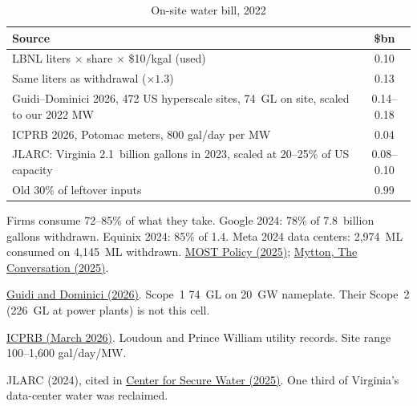 \documentclass[11pt]{article}
\newcommand{\bn}{\$bn}
\begin{document}
\begin{table}[ht]
\centering
\begin{threeparttable}
\caption{On-site water bill, 2022}
\label{tab:water}
\begin{tabular}{p{11.2cm}c}
\toprule
Source & \bn \\
\midrule
LBNL liters $\times$ share $\times$ \$10/kgal (used) & 0.10 \\
Same liters as withdrawal ($\times 1.3$)\tnote{a} & 0.13 \\
Guidi--Dominici 2026, 472 US hyperscale sites, 74~GL on site, scaled to our 2022 MW\tnote{b} & 0.14--0.18 \\
ICPRB 2026, Potomac meters, 800 gal/day per MW\tnote{c} & 0.04 \\
JLARC: Virginia 2.1~billion gallons in 2023, scaled at 20--25\% of US capacity\tnote{d} & 0.08--0.10 \\
Old 30\% of leftover inputs & 0.99 \\
\bottomrule
\end{tabular}
\begin{tablenotes}\footnotesize
\item[a] Firms consume 72--85\% of what they take. Google 2024: 78\% of 7.8~billion gallons withdrawn. Equinix 2024: 85\% of 1.4. Meta 2024 data centers: 2{,}974~ML consumed on 4{,}145~ML withdrawn. \href{https://mostpolicyinitiative.org/science-note/data-center-water-use/}{MOST Policy (2025)}; \href{https://theconversation.com/data-centers-consume-massive-amounts-of-water-companies-rarely-tell-the-public-exactly-how-much-262901}{Mytton, The Conversation (2025)}.
\item[b] \href{https://arxiv.org/abs/2607.02531}{Guidi and Dominici (2026)}. Scope~1 74~GL on 20~GW nameplate. Their Scope~2 (226~GL at power plants) is not this cell.
\item[c] \href{https://www.potomacriver.org/wp-content/uploads/2026/03/ICPRB.DataCentersandWaterUse.ICPRB_.March2026.pdf}{ICPRB (March 2026)}. Loudoun and Prince William utility records. Site range 100--1{,}600 gal/day/MW.
\item[d] JLARC (2024), cited in \href{https://securewater.illinois.edu/data-center-expansion-in-virginia-closing-critical-gaps-for-informed-water-planning-and-permitting/}{Center for Secure Water (2025)}. One third of Virginia's data-center water was reclaimed.
\end{tablenotes}
\end{threeparttable}
\end{table}
\end{document}
